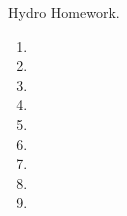 \documentclass[12pt,preprint]{aastex}  %
\begin{document}
Hydro Homework.

\begin{enumerate}
\item 
\item 
\item 
\item 
\item 
\item 
\item 
\item 
\item 
\end{enumerate}
\end{document}
